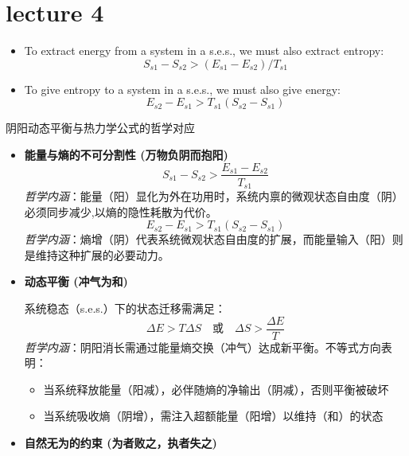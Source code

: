 \section{lecture 4}
\begin{thm}
    \indent
    \begin{itemize}
        \item To extract energy from a system in a s.e.s., we must also extract entropy:
        \[
        S_{s1} - S_{s2} > (E_{s1} - E_{s2}) / T_{s1}
        \]
        \item To give entropy to a system in a s.e.s., we must also give energy:
        \[
        E_{s2} - E_{s1} > T_{s1}(S_{s2} - S_{s1})
        \]
    \end{itemize}
    \begin{add}
阴阳动态平衡与热力学公式的哲学对应

\begin{itemize}
    \item \textbf{能量与熵的不可分割性 (万物负阴而抱阳) }  
    \[
    S_{s1} - S_{s2} > \frac{E_{s1} - E_{s2}}{T_{s1}}
    \]
    \textit{哲学内涵}：能量（阳）显化为外在功用时，系统内禀的微观状态自由度（阴）必须同步减少,以熵的隐性耗散为代价。
    \[
    E_{s2} - E_{s1} > T_{s1}(S_{s2} - S_{s1})
    \]
    \textit{哲学内涵}：熵增（阴）代表系统微观状态自由度的扩展，而能量输入（阳）则是维持这种扩展的必要动力。
    \item \textbf{动态平衡 (冲气为和) }  
    
    系统稳态（s.e.s.）下的状态迁移需满足：
    \[
    \Delta E > T\Delta S \quad \text{或} \quad \Delta S > \frac{\Delta E}{T}
    \]
    \textit{哲学内涵}：阴阳消长需通过能量\textminus 熵交换（冲气）达成新平衡。不等式方向表明：
    \begin{itemize}
        \item 当系统释放能量（阳减），必伴随熵的净输出（阴减），否则平衡被破坏
        \item 当系统吸收熵（阴增），需注入超额能量（阳增）以维持（和）的状态
    \end{itemize}

    \item \textbf{自然无为的约束 (为者败之，执者失之) }
    

\end{itemize}
\end{add}
\end{thm}
